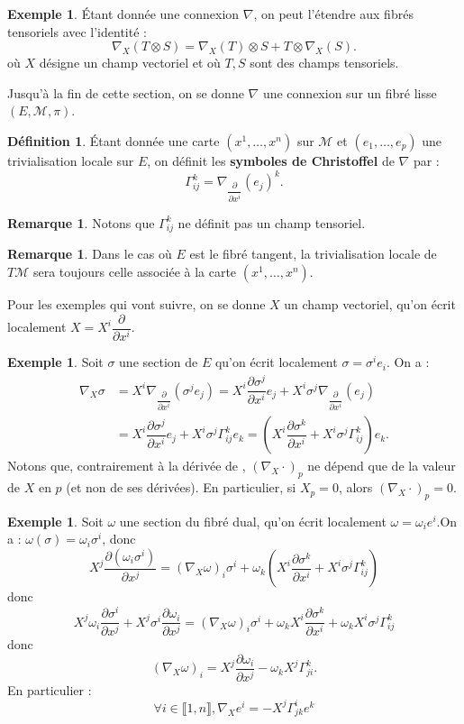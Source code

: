 \documentclass[12pt,a4paper]{article}
\theoremstyle{definition}
\newtheorem{defn}[thm]{Définition}
\newtheorem{ex}[thm]{Exemple}
\newtheorem{rqe}[thm]{Remarque}
\begin{document}
\begin{ex}
Étant donnée une connexion $\nabla$, on peut l'étendre aux fibrés tensoriels avec l'identité :
$$
\nabla_X(T\otimes S)=\nabla_X(T)\otimes S+T\otimes\nabla_X(S).
$$
où $X$ désigne un champ vectoriel et où $T,S$ sont des champs tensoriels.
\end{ex}
\newpage
Jusqu'à la fin de cette section, on se donne $\nabla$ une connexion sur un fibré lisse $(E,\mathcal{M},\pi)$.
\begin{defn}
Étant donnée une carte $(x^1,\ldots,x^n)$ sur $\mathcal{M}$ et $(e_1,\ldots,e_p)$ une trivialisation locale sur $E$, on définit les \textbf{symboles de Christoffel} de $\nabla$ par :
$$\Gamma_{ij}^k=\nabla_{\dfrac{\partial}{\partial x^i}}\left(e_j\right)^k.$$
\end{defn}
\begin{rqe}
Notons que $\Gamma_{ij}^k$ ne définit pas un champ tensoriel.
\end{rqe}
\begin{rqe}
Dans le cas où $E$ est le fibré tangent, la trivialisation locale de $T\mathcal{M}$ sera toujours celle associée à la carte $(x^1,\ldots,x^n)$.
\end{rqe}
Pour les exemples qui vont suivre, on se donne $X$ un champ vectoriel, qu'on écrit localement $X=X^i\dfrac{\partial}{\partial x^i}$.
\begin{ex}
Soit $\sigma$ une section de $E$ qu'on écrit localement $\sigma=\sigma^ie_i$. On a :
\begin{align*}
\nabla_X\sigma&=X^i\nabla_{\dfrac{\partial}{\partial x^i}}\left(\sigma^je_j\right)=X^i\dfrac{\partial \sigma^j}{\partial x^i}e_j+X^i\sigma^j\nabla_{\dfrac{\partial}{\partial x^i}}\left(e_j\right)\\&=X^i\dfrac{\partial \sigma^j}{\partial x^i}e_j+X^i\sigma^j\Gamma_{ij}^ke_k=\left(X^i\dfrac{\partial \sigma^k}{\partial x^i}+X^i\sigma^j\Gamma_{ij}^k\right)e_k.
\end{align*}
Notons que, contrairement à la dérivée de , $(\nabla_X\cdot)_p$ ne dépend que de la valeur de $X$ en $p$ (et non de ses dérivées). En particulier, si $X_p=0$, alors $(\nabla_X\cdot)_p=0$.
\end{ex}
\begin{ex}
Soit $\omega$ une section du fibré dual, qu'on écrit localement $\omega=\omega_ie^i$.\newline On a : $\omega(\sigma)=\omega_i\sigma^i$, donc 
$$
X^j\dfrac{\partial (\omega_i\sigma^i)}{\partial x^j}=(\nabla_X\omega)_i\sigma^i+\omega_k\left(X^i\dfrac{\partial \sigma^k}{\partial x^i}+X^i\sigma^j\Gamma_{ij}^k\right)
$$
donc
$$
X^j\omega_i\dfrac{\partial \sigma^i}{\partial x^j}+X^j\sigma^i\dfrac{\partial\omega_i}{\partial x^j}=(\nabla_X\omega)_i\sigma^i+\omega_kX^i\dfrac{\partial \sigma^k}{\partial x^i}+\omega_kX^i\sigma^j\Gamma_{ij}^k
$$
donc
$$
\left(\nabla_X\omega\right)_i=X^j\dfrac{\partial\omega_i}{\partial x^j}-\omega_kX^j\Gamma_{ji}^k.
$$
En particulier :
$$\forall i\in\llbracket 1,n\rrbracket,\nabla_Xe^i=-X^j\Gamma_{jk}^ie^k$$
\end{ex}
\end{document}
